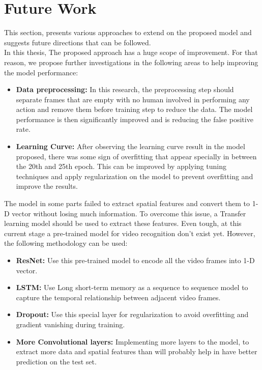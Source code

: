 \section{Future Work}
\hspace{5mm} This section, presents various approaches to extend on the proposed model and suggests future directions that can be followed.\\
In this thesis, The proposed approach has a huge scope of improvement. For that reason, we propose further investigations in the following areas to help improving the model performance:
\begin{itemize}
    \item \textbf{Data preprocessing:} In this research, the preprocessing step should separate frames that are empty with no human involved in performing any action and remove them before training step to reduce the data. The model performance is then significantly improved and is reducing the false positive rate.
    \item \textbf{Learning Curve:} After observing the learning curve result in the model proposed, there was some sign of overfitting that appear specially in between the 20th and 25th epoch. This can be improved by applying tuning techniques and apply regularization on the model to prevent overfitting and improve the results.
    
\end{itemize}
\hspace{5mm} The model in some parts failed to extract spatial features and convert them to 1-D vector without losing much information. To overcome this issue, a Transfer learning model should be used to extract these features. Even tough, at this current stage a pre-trained model for video recognition don’t exist yet. However, the following methodology can be used:
\begin{itemize}
    \item \textbf{ResNet:} Use this pre-trained model to encode all the video frames into 1-D vector.
    \item \textbf{LSTM:} Use Long short-term memory as a sequence to sequence model to capture the temporal relationship between adjacent video frames.
    \item \textbf{Dropout:} Use this special layer for regularization to avoid overfitting and gradient vanishing during training.
    \item \textbf{More Convolutional layers:} Implementing more layers to the model, to extract more data and spatial features than will probably help in have better prediction on the test set.
\end{itemize}

